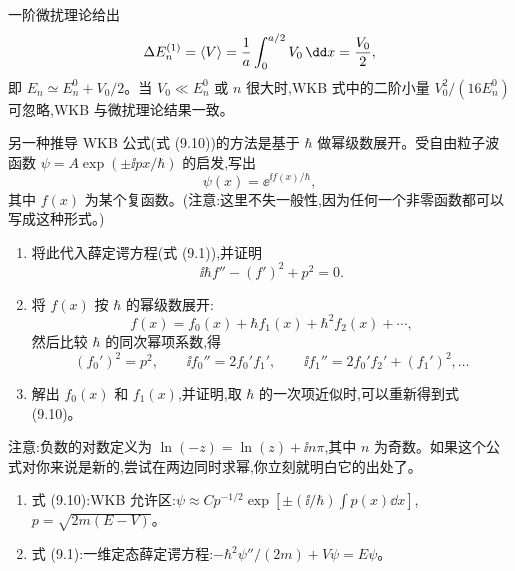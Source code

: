 \begin{solution}
一阶微扰理论给出
\[
\Delta E_n^{(1)}=\langle V\rangle
={1\over a}\int_0^{a/2}V_0\,\dd x={V_0\over2},
\]
即 $E_n\simeq E_n^0+V_0/2$。当 $V_0\ll E_n^0$ 或 $n$ 很大时,WKB 式中的二阶小量 $V_0^2/(16E_n^0)$ 可忽略,WKB 与微扰理论结果一致。
\end{solution}

\begin{question}
另一种推导 WKB 公式(式 (9.10))的方法是基于 $\hbar$ 做幂级数展开。受自由粒子波函数 $\psi=A\exp(\pm \ii px/\hbar)$ 的启发,写出
\[
\psi(x)=\ee^{\ii f(x)/\hbar},
\]
其中 $f(x)$ 为某个复函数。(注意:这里不失一般性,因为任何一个非零函数都可以写成这种形式。)
\begin{enumerate}
\item 将此代入薛定谔方程(式 (9.1)),并证明
\[
\ii\hbar f''-(f')^2+p^2=0.
\]
\item 将 $f(x)$ 按 $\hbar$ 的幂级数展开:
\[
f(x)=f_0(x)+\hbar f_1(x)+\hbar^2f_2(x)+\cdots,
\]
然后比较 $\hbar$ 的同次幂项系数,得
\[
(f_0')^2=p^2,\qquad \ii f_0''=2f_0'f_1',\qquad \ii f_1''=2f_0'f_2'+(f_1')^2,\ldots
\]
\item 解出 $f_0(x)$ 和 $f_1(x)$,并证明,取 $\hbar$ 的一次项近似时,可以重新得到式 (9.10)。
\end{enumerate}
注意:负数的对数定义为 $\ln(-z)=\ln(z)+\ii n\pi$,其中 $n$ 为奇数。如果这个公式对你来说是新的,尝试在两边同时求幂,你立刻就明白它的出处了。

\par\smallskip
{}
\begin{enumerate}[leftmargin=2.2em,itemsep=0.12em,topsep=0.12em,parsep=0pt]
\item 式 (9.10):WKB 允许区:$\psi\approx C p^{-1/2}\exp[\pm(\ii/\hbar)\int p(x)\dd x]$,$p=\sqrt{2m(E-V)}$。
\item 式 (9.1):一维定态薛定谔方程:$-\hbar^2\psi''/(2m)+V\psi=E\psi$。
\end{enumerate}

\end{question}
